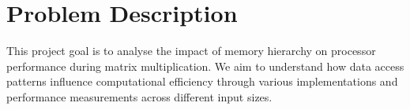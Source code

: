 \section{Problem Description}
This project goal is to analyse the impact of memory hierarchy on 
processor performance during matrix multiplication. We aim to 
understand how data access patterns influence computational 
efficiency through various implementations and performance 
measurements across different input sizes.